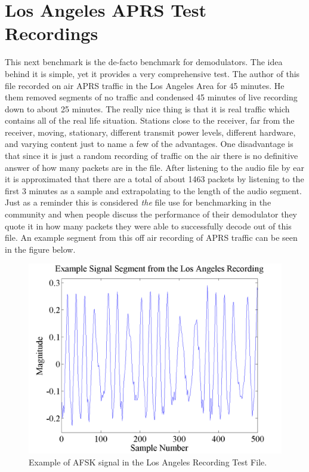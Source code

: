 \section{Los Angeles APRS Test Recordings}
This next benchmark is the de-facto benchmark for demodulators. The idea behind it is simple, yet it provides a very comprehensive test. The author of this file recorded on air APRS traffic in the Los Angeles Area for 45 minutes. He them removed segments of no traffic and condensed 45 minutes of live recording down to about 25 minutes. The really nice thing is that it is real traffic which contains all of the real life situation. Stations close to the receiver, far from the receiver, moving, stationary, different transmit power levels, different hardware, and varying content just to name a few of the advantages. One disadvantage is that since it is just a random recording of traffic on the air there is no definitive answer of how many packets are in the file. After listening to the audio file by ear it is approximated that there are a total of about 1463 packets by listening to the first 3 minutes as a sample and extrapolating to the length of the audio segment. Just as a reminder this is considered \textit{the} file use for benchmarking in the community and when people discuss the performance of their demodulator they quote it in how many packets they were able to successfully decode out of this file. An example segment from this off air recording of APRS traffic can be seen in the figure below.
\begin{figure}
  \centering
	\includegraphics[width=0.75\linewidth]{images/ExampleSignalSegmentfromtheLosAngelesRecording.png} 
	\caption{Example of AFSK signal in the Los Angeles Recording Test File.}
\end{figure}
